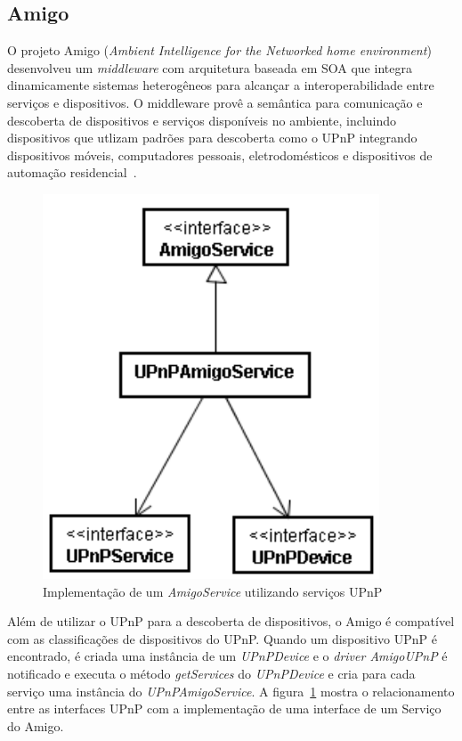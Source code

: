 \subsection{Amigo}
O projeto Amigo (\emph{Ambient Intelligence for the Networked home environment}) desenvolveu um \emph{middleware} com arquitetura baseada em SOA que integra dinamicamente sistemas heterogêneos para alcançar a interoperabilidade entre serviços e dispositivos. O middleware provê a semântica para comunicação e descoberta de dispositivos e serviços disponíveis no ambiente, incluindo dispositivos que utlizam padrões para descoberta como o UPnP integrando dispositivos móveis, computadores pessoais, eletrodomésticos e dispositivos de automação residencial~\cite{amigoArch}.

\begin{figure}[ht]
\center
\includegraphics[scale=0.5]{imagens/amigo-interfaces}
\caption{Implementação de um \emph{AmigoService} utilizando serviços UPnP~\cite{amigoCore}}
\label{fig:amigoInterfaces}
\end{figure}

Além de utilizar o UPnP para a descoberta de dispositivos, o Amigo é compatível com as classificações de dispositivos do UPnP. Quando um dispositivo UPnP é encontrado, é criada uma instância de um \emph{UPnPDevice} e o \emph{driver AmigoUPnP} é notificado e executa o método \emph{getServices} do \emph{UPnPDevice} e cria para cada serviço uma instância do \emph{UPnPAmigoService}. A figura~\ref{fig:amigoInterfaces} mostra o relacionamento entre as interfaces UPnP com a implementação de uma interface de um Serviço do Amigo.

